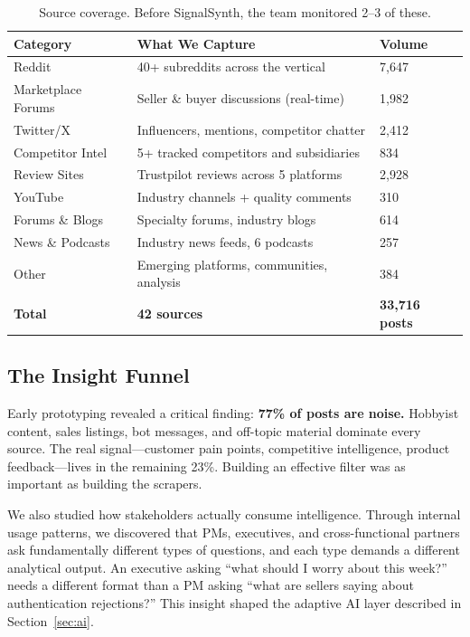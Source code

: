 \documentclass[11pt]{article}
\begin{document}
\begin{table}[h]
\centering
\small
\begin{tabular}{@{}lll@{}}
\toprule
\textbf{Category} & \textbf{What We Capture} & \textbf{Volume} \\
\midrule
Reddit & 40+ subreddits across the vertical & 7,647 \\
Marketplace Forums & Seller \& buyer discussions (real-time) & 1,982 \\
Twitter/X & Influencers, mentions, competitor chatter & 2,412 \\
Competitor Intel & 5+ tracked competitors and subsidiaries & 834 \\
Review Sites & Trustpilot reviews across 5 platforms & 2,928 \\
YouTube & Industry channels + quality comments & 310 \\
Forums \& Blogs & Specialty forums, industry blogs & 614 \\
News \& Podcasts & Industry news feeds, 6 podcasts & 257 \\
Other & Emerging platforms, communities, analysis & 384 \\
\midrule
\textbf{Total} & \textbf{42 sources} & \textbf{33,716 posts} \\
\bottomrule
\end{tabular}
\caption{Source coverage. Before SignalSynth, the team monitored 2--3 of these.}
\label{tab:sources}
\end{table}

\subsection{The Insight Funnel}
Early prototyping revealed a critical finding: \textbf{77\% of posts are noise.} Hobbyist content, sales listings, bot messages, and off-topic material dominate every source. The real signal---customer pain points, competitive intelligence, product feedback---lives in the remaining 23\%. Building an effective filter was as important as building the scrapers.

We also studied how stakeholders actually consume intelligence. Through internal usage patterns, we discovered that PMs, executives, and cross-functional partners ask fundamentally different types of questions, and each type demands a different analytical output. An executive asking ``what should I worry about this week?'' needs a different format than a PM asking ``what are sellers saying about authentication rejections?'' This insight shaped the adaptive AI layer described in Section~\ref{sec:ai}.
\end{document}
